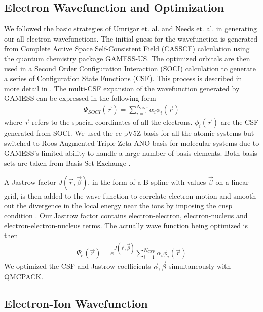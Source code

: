 \documentclass[aps,prl,superscriptaddress,groupedaddress]{revtex4}
\begin{document}
\subsection{Electron Wavefunction and Optimization}
We followed the basic strategies of Umrigar et. al.\cite{Umrigar_Alleviation,Toulouse_Bench} and Needs et. al. \cite{Brown_Bench,Seth_Bench} in generating our all-electron wavefunctions. The initial guess for the wavefunction is generated from Complete Active Space Self-Consistent Field (CASSCF) \cite{Chaban_MCSCF,Szabo} calculation using the quantum chemistry package GAMESS-US\cite{GAMESS}. The optimized orbitals are then used in a Second Order Configuration Interaction (SOCI) calculation to generate a series of Configuration State Functions (CSF). This process is described in more detail in \cite{Clark_Bench}. The multi-CSF expansion of the wavefunction generated by GAMESS can be expressed in the following form
\begin{align}
\Psi_{SOCI}(\vec{r})=\sum\limits_{i=1}^{N_{CSF}}\alpha_i\phi_i(\vec{r}) \label{eq:psi_gms}
\end{align}
where $\vec{r}$ refers to the spacial coordinates of all the electrons. $\phi_i(\vec{r})$ are the CSF generated from SOCI. We used the cc-pV5Z basis for all the atomic systems but switched to Roos Augmented Triple Zeta ANO basis for molecular systems due to GAMESS's limited ability to handle a large number of basis elements. Both basis sets are taken from Basis Set Exchange \cite{BSE}.

A Jastrow factor $J(\vec{r},\vec{\beta})$, in the form of a B-spline with values $\vec{\beta}$ on a linear grid, is then added to the wave function to correlate electron motion and smooth out the divergence in the local energy near the ions by imposing the cusp condition \cite{Kato}. Our Jastrow factor contains electron-electron, electron-nucleus and electron-electron-nucleus terms. The actually wave function being optimized is then
\begin{align}
\Psi_e(\vec{r})=e^{J(\vec{r},\vec{\beta})}\sum\limits_{i=1}^{N_{CSF}}\alpha_i\phi_i(\vec{r})\label{eq:psie}
\end{align}
We optimized the CSF and Jastrow coefficients $\vec{\alpha},\vec{\beta}$ simultaneously with QMCPACK\cite{QMCPACK}.

\subsection{Electron-Ion Wavefunction}
\end{document}
